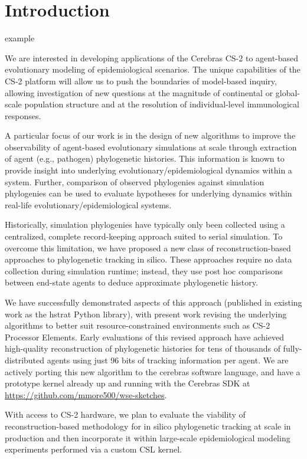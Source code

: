 \section{Introduction} \label{sec:introduction}

example \citep{gagliardi2019international}

We are interested in developing applications of the Cerebras CS-2 to agent-based evolutionary modeling of epidemiological scenarios.
The unique capabilities of the CS-2 platform will allow us to push the boundaries of model-based inquiry, allowing investigation of new questions at the magnitude of continental or global-scale population structure and at the resolution of individual-level immunological responses.

A particular focus of our work is in the design of new algorithms to improve the observability of agent-based evolutionary simulations at scale through extraction of agent (e.g., pathogen) phylogenetic histories.
This information is known to provide insight into underlying evolutionary/epidemiological dynamics within a system.
Further, comparison of observed phylogenies against simulation phylogenies can be used to evaluate hypotheses for underlying dynamics within real-life evolutionary/epidemiological systems.

Historically, simulation phylogenies have typically only been collected using a centralized, complete record-keeping approach suited to serial simulation.
To overcome this limitation, we have proposed a new class of reconstruction-based approaches to phylogenetic tracking in silico.
These approaches require no data collection during simulation runtime; instead, they use post hoc comparisons between end-state agents to deduce approximate phylogenetic history.

We have successfully demonstrated aspects of this approach (published in existing work as the hstrat Python library), with present work revising the underlying algorithms to better suit resource-constrained environments such as CS-2 Processor Elements.
Early evaluations of this revised approach have achieved high-quality reconstruction of phylogenetic histories for tens of thousands of fully-distributed agents using just 96 bits of tracking information per agent.
We are actively porting this new algorithm to the cerebras software language, and have a prototype kernel already up and running with the Cerebras SDK at \url{https://github.com/mmore500/wse-sketches}.

With access to CS-2 hardware, we plan to evaluate the viability of reconstruction-based methodology for in silico phylogenetic tracking at scale in production and then incorporate it within large-scale epidemiological modeling experiments performed via a custom CSL kernel.

